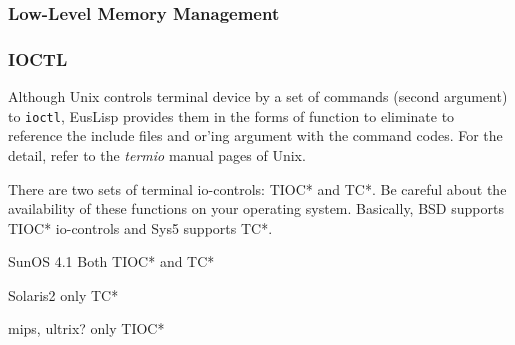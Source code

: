 \subsubsection{Low-Level Memory Management}
\begin{refdesc}

\end{refdesc}

\subsubsection{IOCTL}
Although Unix controls terminal device by a set of commands (second argument) to 
{\tt ioctl}, EusLisp provides them in the forms of function to eliminate
to reference the include files and or'ing argument with the command codes.
For the detail, refer to the {\em termio} manual pages of Unix.

There are two sets of terminal io-controls: TIOC* and TC*.
Be careful about the availability of these functions on your operating system.
Basically, BSD supports TIOC* io-controls and Sys5 supports TC*.
\begin{description}
\item{SunOS 4.1} Both TIOC* and TC*
\item{Solaris2} only TC*
\item{mips, ultrix?} only TIOC*
\end{description}

